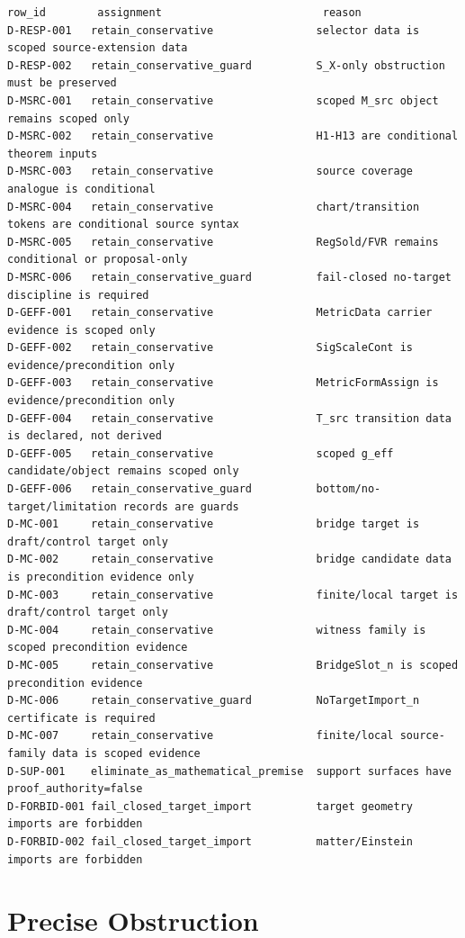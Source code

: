 \documentclass[11pt]{article}
\begin{document}
\begin{verbatim}
row_id        assignment                         reason
D-RESP-001   retain_conservative                selector data is scoped source-extension data
D-RESP-002   retain_conservative_guard          S_X-only obstruction must be preserved
D-MSRC-001   retain_conservative                scoped M_src object remains scoped only
D-MSRC-002   retain_conservative                H1-H13 are conditional theorem inputs
D-MSRC-003   retain_conservative                source coverage analogue is conditional
D-MSRC-004   retain_conservative                chart/transition tokens are conditional source syntax
D-MSRC-005   retain_conservative                RegSold/FVR remains conditional or proposal-only
D-MSRC-006   retain_conservative_guard          fail-closed no-target discipline is required
D-GEFF-001   retain_conservative                MetricData carrier evidence is scoped only
D-GEFF-002   retain_conservative                SigScaleCont is evidence/precondition only
D-GEFF-003   retain_conservative                MetricFormAssign is evidence/precondition only
D-GEFF-004   retain_conservative                T_src transition data is declared, not derived
D-GEFF-005   retain_conservative                scoped g_eff candidate/object remains scoped only
D-GEFF-006   retain_conservative_guard          bottom/no-target/limitation records are guards
D-MC-001     retain_conservative                bridge target is draft/control target only
D-MC-002     retain_conservative                bridge candidate data is precondition evidence only
D-MC-003     retain_conservative                finite/local target is draft/control target only
D-MC-004     retain_conservative                witness family is scoped precondition evidence
D-MC-005     retain_conservative                BridgeSlot_n is scoped precondition evidence
D-MC-006     retain_conservative_guard          NoTargetImport_n certificate is required
D-MC-007     retain_conservative                finite/local source-family data is scoped evidence
D-SUP-001    eliminate_as_mathematical_premise  support surfaces have proof_authority=false
D-FORBID-001 fail_closed_target_import          target geometry imports are forbidden
D-FORBID-002 fail_closed_target_import          matter/Einstein imports are forbidden
\end{verbatim}

\section{Precise Obstruction}
\end{document}
